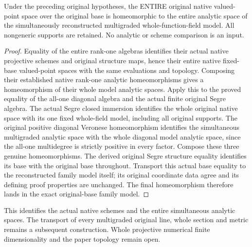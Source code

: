 \begin{theorem}\label{thm:original-simultaneous-native-model-homeomorphism}
\leanok
{}
Under the preceding original hypotheses, the ENTIRE original native valued-point space over the original base is homeomorphic to the entire analytic space of the simultaneously reconstructed multigraded whole-function-field model. All nongeneric supports are retained. No analytic or scheme comparison is an input.
\end{theorem}
\begin{proof}
Equality of the entire rank-one algebras identifies their actual native projective schemes and original structure maps, hence their entire native fixed-base valued-point spaces with the same evaluations and topology. Composing their established native rank-one analytic homeomorphisms gives a homeomorphism of their whole model analytic spaces. Apply this to the proved equality of the all-one diagonal algebra and the actual finite original Segre algebra. The actual Segre closed immersion identifies the whole original native space with its one fixed whole-field model, including all original supports. The original positive diagonal Veronese homeomorphism identifies the simultaneous multigraded analytic space with the whole diagonal model analytic space, since the all-one multidegree is strictly positive in every factor. Compose these three genuine homeomorphisms. The derived original Segre structure equality identifies its base with the original base throughout. Transport this actual base equality to the reconstructed family model itself; its original coordinate data agree and its defining proof properties are unchanged. The final homeomorphism therefore lands in the exact original-base family model.
\end{proof}
This identifies the actual native schemes and the entire simultaneous analytic spaces. The transport of every multigraded original line, whole section and metric remains a subsequent construction. Whole projective numerical finite dimensionality and the paper topology remain open.
